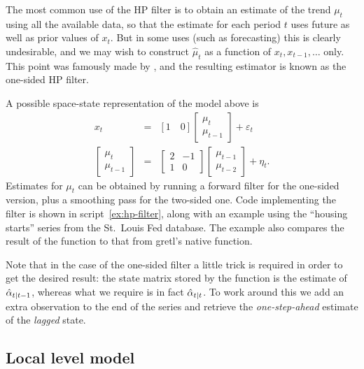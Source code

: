The most common use of the HP filter is to obtain an estimate of the
trend $\mu_t$ using all the available data, so that the estimate for
each period $t$ uses future as well as prior values of $x_t$. But in
some uses (such as forecasting) this is clearly undesirable, and we
may wish to construct $\hat{\mu}_t$ as a function of
$x_t, x_{t-1}, \ldots$ only. This point was famously made by
\cite{stock-watson1999}, and the resulting estimator is known as the
one-sided HP filter.

A possible space-state representation of the model above is
\begin{eqnarray*}
  x_t & = & [1 \quad 0]
            \left[ \begin{array}{c} \mu_t \\ \mu_{t-1}\end{array}\right]
  + \varepsilon_t \\
  \left[ \begin{array}{c} \mu_t \\ \mu_{t-1}\end{array}\right] & = &
  \left[ \begin{array}{rr} 2 & -1 \\ 1 & 0 \end{array}\right]
  \left[ \begin{array}{c} \mu_{t-1} \\ \mu_{t-2}\end{array}\right] +
  \eta_t .
\end{eqnarray*}
Estimates for $\mu_t$ can be obtained by running a forward filter for
the one-sided version, plus a smoothing pass for the two-sided
one. Code implementing the filter is shown in script~\ref{ex:hp-filter},
along with an example using the ``housing starts'' series from the
St.~Louis Fed database. The example also compares the result of the
function to that from gretl's native  function.

Note that in the case of the one-sided filter a little trick is
required in order to get the desired result: the state matrix stored
by the  function is the estimate of
$\hat{\alpha}_{t|t-1}$, whereas what we require is in fact
$\hat{\alpha}_{t|t}$. To work around this we add an extra
observation to the end of the series and retrieve the
\emph{one-step-ahead} estimate of the \emph{lagged} state.

\subsection{Local level model}
\label{sec:example_loclev}


